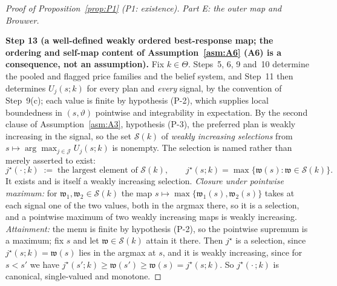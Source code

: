 \begin{proof}[Proof of Proposition~\ref{prop:P1} (P1: existence)]
\medskip
\noindent\emph{Part E: the outer map and Brouwer.}

\smallskip
\noindent\textbf{Step 13 (a well-defined weakly ordered best-response map; the ordering and self-map
content of Assumption~\ref{asm:A6} (A6) is a consequence, not an assumption).}
Fix $k \in \Theta$. Steps~5, 6, 9 and~10 determine the pooled and flagged price families and the
belief system, and Step~11 then determines $U_j(s;k)$ for every plan and \emph{every} signal, by the
convention of Step~9(c); each value is finite by hypothesis (P-2), which supplies local boundedness
in $(s,\vartheta)$ pointwise and integrability in expectation. By the second clause of
Assumption~\ref{asm:A3}, hypothesis (P-3), the preferred plan is weakly increasing in the signal, so
the set $\mathcal S(k)$ of \emph{weakly increasing selections} from
$s \mapsto \arg\max_{j \in \mathcal J} U_j(s;k)$ is nonempty. The selection is named rather than
merely asserted to exist:
\begin{equation}
\label{eq:P1-jstar}
j^\star(\cdot\,;k) \;:=\; \text{the largest element of } \mathcal S(k),
\qquad
j^\star(s;k) = \max\bigl\{\mathfrak w(s) : \mathfrak w \in \mathcal S(k)\bigr\}.
\end{equation}
It exists and is itself a weakly increasing selection. \emph{Closure under pointwise maximum:} for
$\mathfrak w_1,\mathfrak w_2 \in \mathcal S(k)$ the map $s \mapsto \max\{\mathfrak w_1(s),
\mathfrak w_2(s)\}$ takes at each signal one of the two values, both in the argmax there, so it is a
selection, and a pointwise maximum of two weakly increasing maps is weakly increasing.
\emph{Attainment:} the menu is finite by hypothesis (P-2), so the pointwise supremum is a maximum;
fix $s$ and let $\mathfrak w \in \mathcal S(k)$ attain it there. Then $j^\star$ is a selection, since
$j^\star(s;k) = \mathfrak w(s)$ lies in the argmax at $s$, and it is weakly increasing, since for
$s < s'$ we have $j^\star(s';k) \ge \mathfrak w(s') \ge \mathfrak w(s) = j^\star(s;k)$. So
$j^\star(\cdot\,;k)$ is canonical, single-valued and monotone.


\end{proof}

